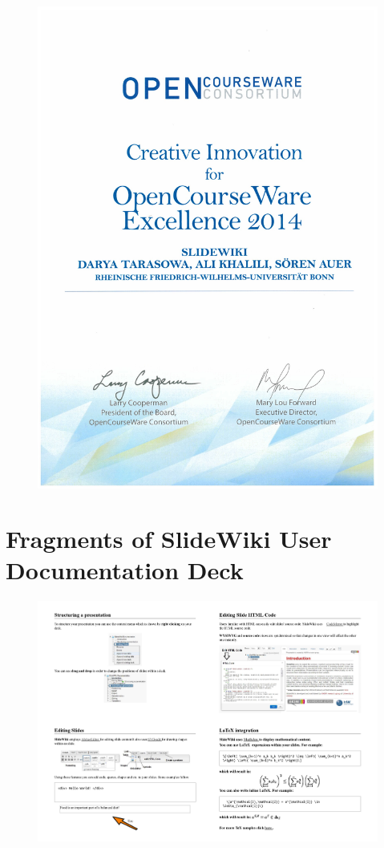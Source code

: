 \begin{figure}
\centering
\includegraphics[width=\columnwidth]{images/award.jpg}
\end{figure}

\chapter{Fragments of SlideWiki User Documentation Deck}
\label{slidewiki_documentation}

\begin{figure}
    \centering
    \includegraphics[width=\columnwidth]{images/page1.pdf}
    
\end{figure}

